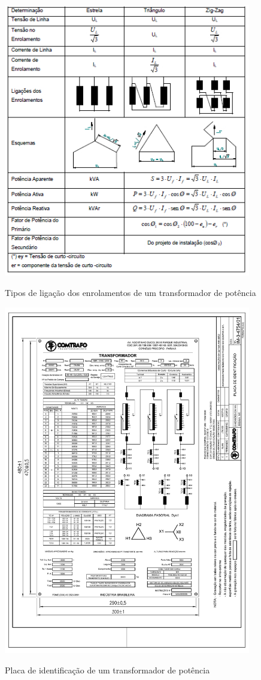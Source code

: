 \documentclass[a5paper,english,spanish,brazil]{ufsc-thesis}
\begin{document}
\begin{figure}[htb]
  \caption{Tipos de ligação dos enrolamentos de um transformador de potência}
  \centering
  \includegraphics[width=10.8cm]{tiposdenrol.jpg}
  \label{fig:tiposdenrol}
\end{figure}

\begin{figure}[htb]
  \caption{Placa de identificação de um transformador de potência}
  \centering
  \includegraphics[width=10.8cm]{placatrafo.pdf}
  \label{fig:placatrafo}
\end{figure}
\end{document}
